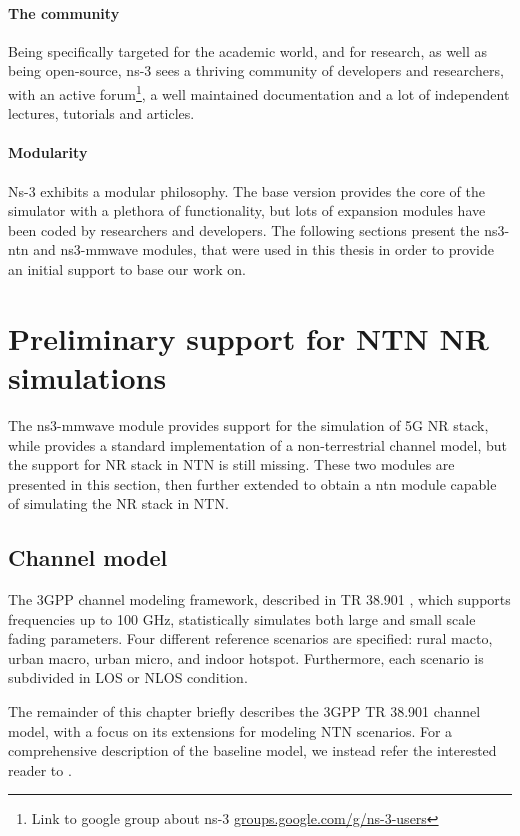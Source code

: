 \paragraph{The community}
Being specifically targeted for the academic world, and for research, as well as being open-source, ns-3 sees a thriving community of developers and researchers, with an active forum\footnote{Link to google group about ns-3 \href{https://groups.google.com/g/ns-3-users}{groups.google.com/g/ns-3-users}}, a well maintained documentation and a lot of independent lectures, tutorials and articles. 

\paragraph{Modularity}
Ns-3 exhibits a modular philosophy. The base version provides the core of the simulator with a plethora of functionality, but lots of expansion modules have been coded by researchers and developers. The following sections present the ns3-ntn and ns3-mmwave modules, that were used in this thesis in order to provide an initial support to base our work on.


\section{Preliminary support for NTN NR simulations}
The ns3-mmwave module provides support for the simulation of 5G \ac{NR} stack, while \cite{Sandri_2023} provides a standard implementation of a non-terrestrial channel model, but the support for \ac{NR} stack in \ac{NTN} is still missing. These two modules are presented in this section, then further extended to obtain a ntn module capable of simulating the \ac{NR} stack in \ac{NTN}.

\subsection{Channel model}
The \ac{3GPP} channel modeling framework, described in TR 38.901 \cite{3gpp-tr-38.901}, which supports frequencies up to 100 GHz, statistically simulates both large and small scale fading parameters. Four different reference scenarios are specified: rural macto, urban macro, urban micro, and indoor hotspot. Furthermore, each scenario is subdivided in \ac{LOS} or N\ac{LOS} condition.

The remainder of this chapter briefly describes the \ac{3GPP} TR 38.901 channel model, with a focus on its extensions for modeling \ac{NTN} scenarios. For a comprehensive description of the baseline model, we instead refer the interested reader to \cite{channel-model-ns3}.

